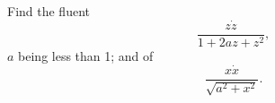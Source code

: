 Find the fluent 
\[
\dfrac{ z \dot{z} }{ 1 + 2az + z^2 },
\]
$a$ being less than 1; and of
\[
\dfrac{ x \dot{x} }{ \sqrt{a^2 + x^2} }.
\]
